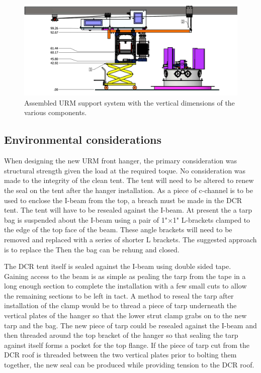 \documentclass[11pt]{article}
\begin{document}
\begin{figure}[htbp]
\begin{center}
\includegraphics[width=\textwidth]{AssembledMechanismWithURM.png}
\caption{Assembled URM support system with the vertical dimensions of the various components.}
\label{default}
\end{center}
\end{figure}



\subsection{Environmental considerations}
When designing the new URM front hanger, the primary consideration was structural strength given the load at the required toque. No consideration was made to the integrity of the clean tent. The tent will need to be altered to renew the seal on the tent after the hanger installation. As a piece of c-channel is to be used to enclose the I-beam from the top, a breach must be made in the DCR tent. The tent will have to be resealed against the I-beam. At present the a tarp bag is suspended about the I-beam using a pair of 1"$\times$1" L-brackets clamped to the edge of the top face of the beam. These angle brackets will need to be removed and replaced with a series of shorter L brackets. The suggested approach is to replace the Then the bag can be rehung and closed. 

The DCR tent itself is sealed against the I-beam using double sided tape. Gaining access to the beam is as simple as pealing the tarp from the tape in a long enough section to complete the installation with a few small cuts to allow the remaining sections to be left in tact. A method to reseal the tarp after installation of the clamp would be to thread a piece of tarp underneath the vertical plates of the hanger so that the lower strut clamp grabs on to the new tarp and the bag. The new piece of tarp could be resealed against the I-beam and then threaded around the top bracket of the hanger so that sealing the tarp against itself forms a pocket for the top flange. If the piece of tarp cut from the DCR roof is threaded between the two vertical plates prior to bolting them together, the new seal can be produced while providing tension to the DCR roof.
\end{document}
